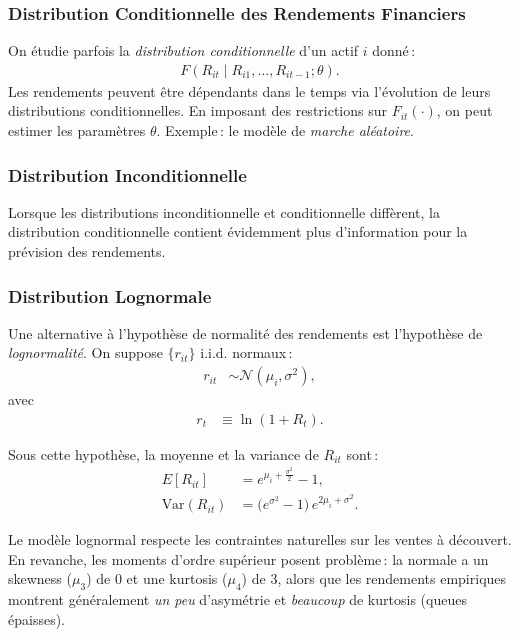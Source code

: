 \documentclass[14pt]{extarticle} %
\begin{document}
\subsubsection{Distribution Conditionnelle des Rendements Financiers}

On étudie parfois la \emph{distribution conditionnelle} d’un actif \(i\) donné :
\begin{align*}
    F(R_{it} \mid R_{i1}, \dots, R_{it-1}; \theta).
\end{align*}
Les rendements peuvent être dépendants dans le temps via l’évolution de leurs distributions conditionnelles. En imposant des restrictions sur \(F_{it}(\cdot)\), on peut estimer les paramètres \(\theta\). Exemple : le modèle de \emph{marche aléatoire}.

\subsubsection{Distribution Inconditionnelle}

Lorsque les distributions inconditionnelle et conditionnelle diffèrent, la distribution conditionnelle contient évidemment plus d’information pour la prévision des rendements.

\subsubsection{Distribution Lognormale}

Une alternative à l’hypothèse de normalité des rendements est l’hypothèse de \emph{lognormalité}.  
On suppose \(\{r_{it}\}\) i.i.d. normaux :
\begin{align*}
    r_{it} &\sim \mathcal{N}(\mu_i, \sigma^2),
\end{align*}
avec
\begin{align*}
    r_t &\equiv \ln(1 + R_t).
\end{align*}

Sous cette hypothèse, la moyenne et la variance de \(R_{it}\) sont :
\begin{align*}
    E[R_{it}] &= e^{\mu_i + \tfrac{\sigma^2}{2}} - 1, \\
    \text{Var}(R_{it}) &= \bigl(e^{\sigma^2} - 1\bigr)\,e^{2\mu_i + \sigma^2}.
\end{align*}

Le modèle lognormal respecte les contraintes naturelles sur les ventes à découvert. En revanche, les moments d’ordre supérieur posent problème : la normale a un skewness (\(\mu_3\)) de 0 et une kurtosis (\(\mu_4\)) de 3, alors que les rendements empiriques montrent généralement \emph{un peu} d’asymétrie et \emph{beaucoup} de kurtosis (queues épaisses).
\end{document}
